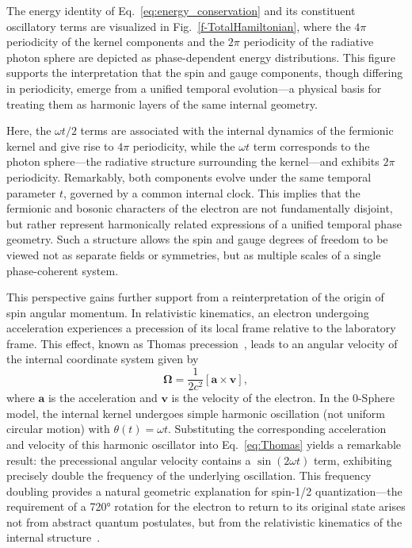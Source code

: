 \documentclass[%
 reprint,
 amsmath,amssymb,
 aps,
]{revtex4-1}
\numberwithin{equation}{section}%
\begin{document}
The energy identity of Eq.~\eqref{eq:energy_conservation} and its constituent oscillatory terms are visualized in Fig.~\ref{f-TotalHamiltonian}, where the $4\pi$ periodicity of the kernel components and the $2\pi$ periodicity of the radiative photon sphere are depicted as phase-dependent energy distributions. This figure supports the interpretation that the spin and gauge components, though differing in periodicity, emerge from a unified temporal evolution—a physical basis for treating them as harmonic layers of the same internal geometry.

Here, the $\omega t/2$ terms are associated with the internal dynamics of the fermionic kernel and give rise to $4\pi$ periodicity, while the $\omega t$ term corresponds to the photon sphere—the radiative structure surrounding the kernel—and exhibits $2\pi$ periodicity. Remarkably, both components evolve under the same temporal parameter $t$, governed by a common internal clock. This implies that the fermionic and bosonic characters of the electron are not fundamentally disjoint, but rather represent harmonically related expressions of a unified temporal phase geometry. Such a structure allows the spin and gauge degrees of freedom to be viewed not as separate fields or symmetries, but as multiple scales of a single phase-coherent system.

This perspective gains further support from a reinterpretation of the origin of spin angular momentum. In relativistic kinematics, an electron undergoing acceleration experiences a precession of its local frame relative to the laboratory frame. This effect, known as Thomas precession~\cite{Thomas1926, thomas1927}, leads to an angular velocity of the internal coordinate system given by~\cite{hanamura2023}
\begin{equation}
\boldsymbol{\Omega} = \frac{1}{2c^2}[\boldsymbol{a} \times \boldsymbol{v}],
\label{eq:Thomas}
\end{equation}
where $\boldsymbol{a}$ is the acceleration and $\boldsymbol{v}$ is the velocity of the electron. In the 0-Sphere model, the internal kernel undergoes simple harmonic oscillation (not uniform circular motion) with $\theta(t) = \omega t$. Substituting the corresponding acceleration and velocity of this harmonic oscillator into Eq.~\eqref{eq:Thomas} yields a remarkable result: the precessional angular velocity contains a $\sin(2\omega t)$ term, exhibiting precisely double the frequency of the underlying oscillation. This frequency doubling provides a natural geometric explanation for spin-1/2 quantization—the requirement of a 720° rotation for the electron to return to its original state arises not from abstract quantum postulates, but from the relativistic kinematics of the internal structure~\cite{hanamura2023}.
\end{document}
